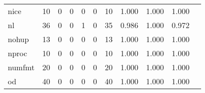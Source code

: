 \begin{longtable}{lp{1.20cm}p{1.20cm}p{1.20cm}p{1.20cm}p{1.20cm}p{1.20cm}p{1.20cm}p{1.20cm}p{1.20cm}p{1.20cm}}
nice      &                                    10 &                                                  0 &                                                  0 &                                                  0 &                                                  0 &                                                 10 &                                         1.000 &                                              1.000 &                                              1.000 \\
nl        &                                    36 &                                                  0 &                                                  0 &                                                  1 &                                                  0 &                                                 35 &                                         0.986 &                                              1.000 &                                              0.972 \\
nohup     &                                    13 &                                                  0 &                                                  0 &                                                  0 &                                                  0 &                                                 13 &                                         1.000 &                                              1.000 &                                              1.000 \\
nproc     &                                    10 &                                                  0 &                                                  0 &                                                  0 &                                                  0 &                                                 10 &                                         1.000 &                                              1.000 &                                              1.000 \\
numfmt    &                                    20 &                                                  0 &                                                  0 &                                                  0 &                                                  0 &                                                 20 &                                         1.000 &                                              1.000 &                                              1.000 \\
od        &                                    40 &                                                  0 &                                                  0 &                                                  0 &                                                  0 &                                                 40 &                                         1.000 &                                              1.000 &                                              1.000 \\

\end{longtable}
